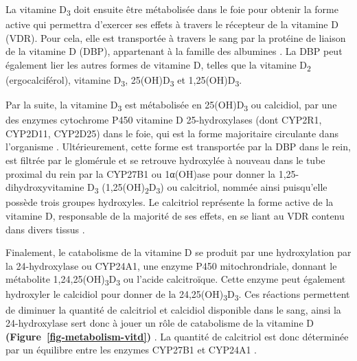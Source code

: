 \documentclass[
  letterpaper,
  DIV=11,
  numbers=noendperiod]{scrartcl}
\begin{document}
La vitamine D\textsubscript{3} doit ensuite être métabolisée dans le
foie pour obtenir la forme active qui permettra d'exercer ses effets à
travers le récepteur de la vitamine D (VDR). Pour cela, elle est
transportée à travers le sang par la protéine de liaison de la vitamine
D (DBP), appartenant à la famille des albumines
\autocite{Christakos.2010,Chun.2012}. La DBP peut également lier les
autres formes de vitamine D, telles que la vitamine D\textsubscript{2}
(ergocalciférol), vitamine D\textsubscript{3}, 25(OH)D\textsubscript{3}
et 1,25(OH)D\textsubscript{3}.

Par la suite, la vitamine D\textsubscript{3} est métabolisée en
25(OH)D\textsubscript{3} ou calcidiol, par une des enzymes cytochrome
P450 vitamine D 25-hydroxylases (dont CYP2R1, CYP2D11, CYP2D25) dans le
foie, qui est la forme majoritaire circulante dans l'organisme
\autocite{Norman.2008,Christakos.2010}. Ultérieurement, cette forme est
transportée par la DBP dans le rein, est filtrée par le glomérule et se
retrouve hydroxylée à nouveau dans le tube proximal du rein par la
CYP27B1 ou 1α(OH)ase pour donner la 1,25-dihydroxyvitamine
D\textsubscript{3} (1,25(OH)\textsubscript{2}D\textsubscript{3}) ou
calcitriol, nommée ainsi puisqu'elle possède trois groupes hydroxyles.
Le calcitriol représente la forme active de la vitamine D, responsable
de la majorité de ses effets, en se liant au VDR contenu dans divers
tissus \autocite{Norman.2008,Dankers.2017}.

Finalement, le catabolisme de la vitamine D se produit par une
hydroxylation par la 24-hydroxylase ou CYP24A1, une enzyme P450
mitochrondriale, donnant le métabolite
1,24,25(OH)\textsubscript{3}D\textsubscript{3} ou l'acide calcitroïque.
Cette enzyme peut également hydroxyler le calcidiol pour donner de la
24,25(OH)\textsubscript{3}D\textsubscript{3}. Ces réactions permettent
de diminuer la quantité de calcitriol et calcidiol disponible dans le
sang, ainsi la 24-hydroxylase sert donc à jouer un rôle de catabolisme
de la vitamine D \textbf{(Figure~\ref{fig-metabolism-vitd})}
\autocite{Norman.2008}. La quantité de calcitriol est donc déterminée
par un équilibre entre les enzymes CYP27B1 et CYP24A1
\autocite{Dankers.2017}.
\end{document}
